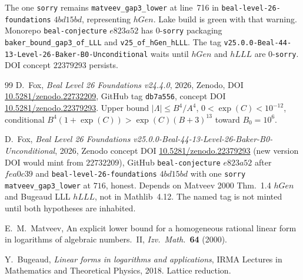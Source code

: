 \documentclass[11pt]{amsart}
\begin{document}
{\small
The one \texttt{sorry} remains \texttt{matveev\_gap3\_lower} at
line~716 in \texttt{beal-level-26-foundations} $4bd15bd$, representing
$hGen$. Lake build is green with that warning.
Monorepo \texttt{beal-conjecture} $e823a52$ has $0$-\texttt{sorry}
packaging \texttt{baker\_bound\_gap3\_of\_LLL} and
\texttt{v25\_of\_hGen\_hLLL}.
The tag
\texttt{v25.0.0-Beal-44-13-Level-26-Baker-B0-Unconditional}
waits until $hGen$ and $hLLL$ are $0$-\texttt{sorry}.
DOI concept $22379293$ persists.
}


\begin{thebibliography}{99}
D.~Fox,
\textit{Beal Level 26 Foundations v24.4.0},
2026,
Zenodo,
DOI \href{https://doi.org/10.5281/zenodo.22732209}{10.5281/zenodo.22732209},
GitHub tag \texttt{db7a556},
concept DOI \href{https://doi.org/10.5281/zenodo.22379293}{10.5281/zenodo.22379293}.
Upper bound $|\Lambda|\le B^4/A^4$, $0<\exp(C)<10^{-12}$,
conditional $B^4(1+\exp(C))>\exp(C)(B+3)^{13}$ toward $B_0=10^6$.

D.~Fox,
\textit{Beal Level 26 Foundations
v25.0.0-Beal-44-13-Level-26-Baker-B0-Unconditional},
2026,
Zenodo concept DOI
\href{https://doi.org/10.5281/zenodo.22379293}{10.5281/zenodo.22379293}
(new version DOI would mint from $22732209$),
GitHub \texttt{beal-conjecture} $e823a52$ after $fea0c39$ and
\texttt{beal-level-26-foundations} $4bd15bd$ with one \texttt{sorry}
\texttt{matveev\_gap3\_lower} at $716$, honest.
Depends on Matveev 2000 Thm.~1.4 $hGen$ and Bugeaud LLL $hLLL$,
not in Mathlib~4.12.
The named tag is not minted until both hypotheses are inhabited.

E.~M.~Matveev,
An explicit lower bound for a homogeneous rational linear form
in logarithms of algebraic numbers.~II,
\textit{Izv.\ Math.}\ \textbf{64} (2000).

Y.~Bugeaud,
\textit{Linear forms in logarithms and applications},
IRMA Lectures in Mathematics and Theoretical Physics,
2018.
Lattice reduction.
\end{thebibliography}
\end{document}

